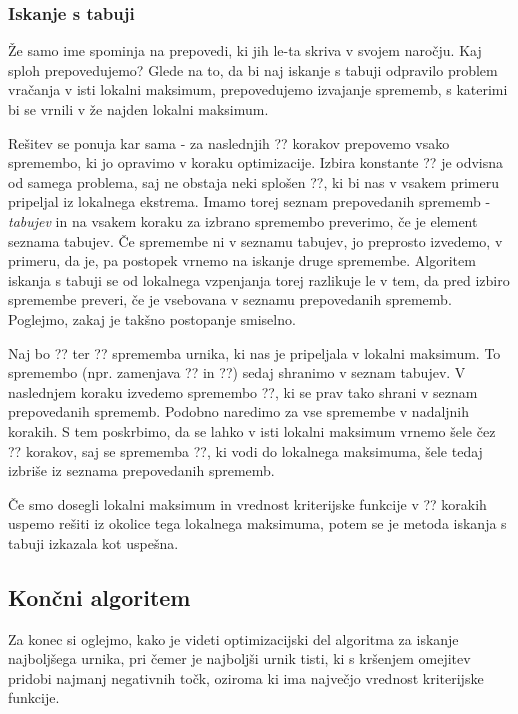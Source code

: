 \documentclass[10pt,a4paper]{article}
\begin{document}
\subsubsection{Iskanje s tabuji}

Že samo ime spominja na prepovedi, ki jih le-ta skriva v svojem naročju. Kaj sploh prepovedujemo?
Glede na to, da bi naj iskanje s tabuji odpravilo problem vračanja v isti lokalni maksimum,
prepovedujemo izvajanje sprememb, s katerimi bi se vrnili v že najden lokalni maksimum.

Rešitev se ponuja kar sama - za naslednjih ?? korakov prepovemo vsako spremembo, ki jo
opravimo v koraku optimizacije. Izbira konstante ?? je odvisna od samega problema, saj
ne obstaja neki splošen ??, ki bi nas v vsakem primeru pripeljal iz lokalnega ekstrema.
Imamo torej seznam prepovedanih sprememb - \emph{tabujev} in na vsakem koraku za izbrano
spremembo preverimo, če je element seznama tabujev. Če spremembe ni v seznamu tabujev, jo
preprosto izvedemo, v primeru, da je, pa postopek vrnemo na iskanje druge spremembe.
Algoritem iskanja s tabuji se od lokalnega vzpenjanja torej razlikuje le v tem, da pred
izbiro spremembe preveri, če je vsebovana v seznamu prepovedanih sprememb. Poglejmo, zakaj
je takšno postopanje smiselno.

Naj bo ?? ter ?? sprememba urnika, ki nas je pripeljala v lokalni maksimum. To
spremembo (npr. zamenjava ?? in ??) sedaj shranimo v
seznam tabujev. V naslednjem koraku izvedemo spremembo ??, ki se prav tako shrani v
seznam prepovedanih sprememb. Podobno naredimo za vse spremembe v nadaljnih korakih. S
tem poskrbimo, da se lahko v isti lokalni maksimum vrnemo šele čez ?? korakov, saj
se sprememba ??, ki vodi do lokalnega maksimuma, šele tedaj izbriše iz seznama
prepovedanih sprememb.

Če smo dosegli lokalni maksimum in vrednost kriterijske funkcije v ?? korakih uspemo
rešiti iz okolice tega lokalnega maksimuma, potem se je metoda iskanja s tabuji izkazala
kot uspešna.

\subsection{Končni algoritem}

Za konec si oglejmo, kako je videti optimizacijski del algoritma za iskanje najboljšega
urnika, pri čemer je najboljši urnik tisti, ki s kršenjem omejitev pridobi najmanj negativnih
točk, oziroma ki ima največjo vrednost kriterijske funkcije.
\end{document}
